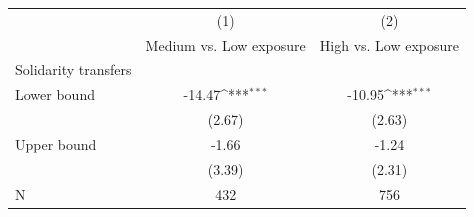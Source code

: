 {
\def\sym#1{\ifmmode^{#1}\else\(^{#1}\)\fi}
\begin{tabular}{l*{2}{c}}
\toprule
                    &\multicolumn{1}{c}{(1)}&\multicolumn{1}{c}{(2)}\\
                    &\multicolumn{1}{c}{Medium vs. Low exposure}&\multicolumn{1}{c}{High vs. Low exposure}\\
\midrule
Solidarity transfers&                     &                     \\
Lower bound         &      -14.47\sym{***}&      -10.95\sym{***}\\
                    &      (2.67)         &      (2.63)         \\
Upper bound         &       -1.66         &       -1.24         \\
                    &      (3.39)         &      (2.31)         \\
\midrule
N                   &         432         &         756         \\
\bottomrule
\end{tabular}
}
